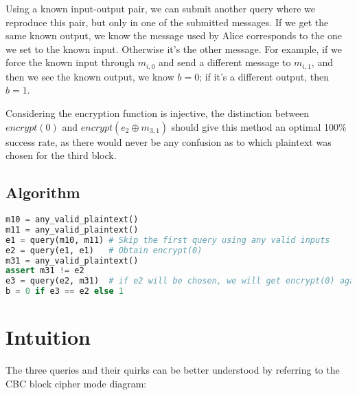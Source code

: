 \documentclass[11pt]{llncs}
\begin{document}
Using a known input-output pair, we can submit another query where we reproduce this pair, but only in one of the submitted messages. If we get the same known output, we know the message used by Alice corresponds to the one we set to the known input. Otherwise it's the other message. For example, if we force the known input through $m_{i,0}$ and send a different message to $m_{i,1}$, and then we see the known output, we know $b=0$; if it's a different output, then $b=1$.

Considering the encryption function is injective, the distinction between $encrypt(0)$ and $encrypt(e_2 \oplus m_{3,1})$ should give this method an optimal 100\% success rate, as there would never be any confusion as to which plaintext was chosen for the third block.

\subsection{Algorithm}
\small
\begin{lstlisting}[basicstyle=\ttfamily,language=Python,showstringspaces=false]
m10 = any_valid_plaintext()
m11 = any_valid_plaintext()
e1 = query(m10, m11) # Skip the first query using any valid inputs
e2 = query(e1, e1)   # Obtain encrypt(0)
m31 = any_valid_plaintext()
assert m31 != e2
e3 = query(e2, m31)  # if e2 will be chosen, we will get encrypt(0) again 
b = 0 if e3 == e2 else 1
\end{lstlisting}
\normalsize

%

\section{Intuition}

The three queries and their quirks can be better understood by referring to the CBC block cipher mode diagram:
\begin{figure}
\centering \def\svgwidth{202pt} 
\end{figure}
\end{document}
